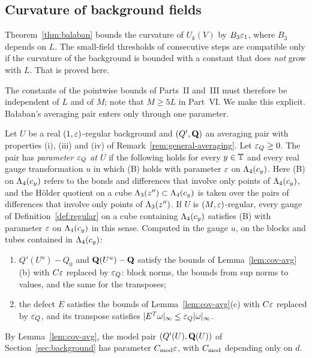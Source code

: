 \subsection{Curvature of background fields}

Theorem~\ref{thm:balaban} bounds the curvature of $U_k(V)$ by $B_3\varepsilon_1$, where $B_3$ depends on $L$. The small-field thresholds of consecutive steps are compatible only if the curvature of the background is bounded with a constant that does \emph{not} grow with $L$. That is proved here.

The constants of the pointwise bounds of Parts~II and~III must therefore be independent of $L$ and of $M$; note that $M\ge5L$ in Part~VI. We make this explicit. Ba\l aban's averaging pair enters only through one parameter.

\begin{definition}\label{def:avg-parameter}
Let $U$ be a real $(1,\varepsilon)$-regular background and $(Q',\mathbf Q)$ an averaging pair with properties (i), (iii) and (iv) of Remark~\ref{rem:general-averaging}. Let $\varepsilon_Q\ge0$. The pair has \emph{parameter $\varepsilon_Q$ at $U$} if the following holds for every $y\in\mathbb T$ and every real gauge transformation $u$ in which (B) holds with parameter $\varepsilon$ on $\Lambda_4(c_y)$. Here (B) on $\Lambda_4(c_y)$ refers to the bonds and differences that involve only points of $\Lambda_4(c_y)$, and the H\"older quotient on a cube $\Lambda_3(z'')\subset\Lambda_4(c_y)$ is taken over the pairs of differences that involve only points of $\Lambda_3(z'')$. If $U$ is $(M,\varepsilon)$-regular, every gauge of Definition~\ref{def:regular} on a cube containing $\Lambda_4(c_y)$ satisfies (B) with parameter $\varepsilon$ on $\Lambda_4(c_y)$ in this sense. Computed in the gauge $u$, on the blocks and tubes contained in $\Lambda_4(c_y)$:
\begin{enumerate}[label=(\alph*)]
\item $Q'(U^u)-Q_0$ and $\mathbf Q(U^u)-\mathbf Q$ satisfy the bounds of Lemma~\ref{lem:cov-avg}(b) with $C\varepsilon$ replaced by $\varepsilon_Q$: block norms, the bounds from sup norms to values, and the same for the transposes;
\item the defect $E$ satisfies the bounds of Lemma~\ref{lem:cov-avg}(c) with $C\varepsilon$ replaced by $\varepsilon_Q$, and its transpose satisfies $|E^T\omega|_\infty\le\varepsilon_Q|\omega|_\infty$.
\end{enumerate}
\end{definition}

By Lemma~\ref{lem:cov-avg}, the model pair $(Q'(U),\mathbf Q(U))$ of Section~\ref{sec:background} has parameter $C_{\rm mod}\varepsilon$, with $C_{\rm mod}$ depending only on $d$.

